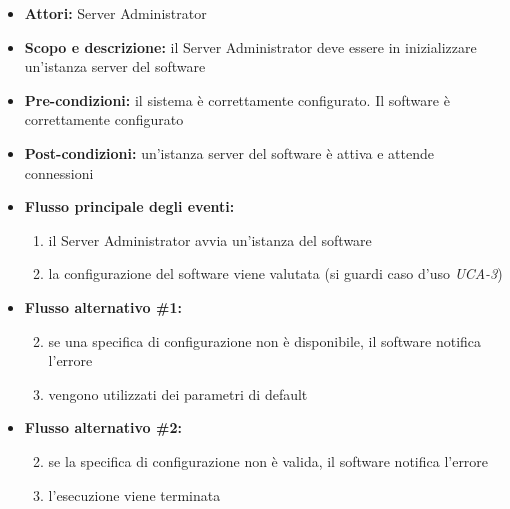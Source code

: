 
\begin{itemize}
	\item \textbf{Attori:} Server Administrator
	\item \textbf{Scopo e descrizione:} il Server Administrator deve essere in inizializzare un'istanza server del software
	\item \textbf{Pre-condizioni:} il sistema è correttamente configurato. Il software è correttamente configurato
	\item \textbf{Post-condizioni:} un'istanza server del software è attiva e attende connessioni
	\item \textbf{Flusso principale degli eventi:}
		\begin{enumerate}
			\item il Server Administrator avvia un'istanza del software
			\item la configurazione del software viene valutata (si guardi caso d'uso \emph{UCA-3})
		\end{enumerate}
	\item \textbf{Flusso alternativo \#1:}
		\begin{enumerate}
			\setcounter{enumi}{1}
			\item se una specifica di configurazione non è disponibile, il software notifica l'errore
			\item vengono utilizzati dei parametri di default
		\end{enumerate}
	\item \textbf{Flusso alternativo \#2:}
		\begin{enumerate}
			\setcounter{enumi}{1}
			\item se la specifica di configurazione non è valida, il software notifica l'errore
			\item l'esecuzione viene terminata
		\end{enumerate}
\end{itemize}
